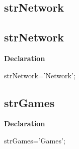 \documentclass{report}
\newif\ifpdf
\begin{document}
\subsection*{\large{\textbf{strNetwork}}\normalsize\hspace{1ex}\hrulefill}
\else
\subsection*{strNetwork}
\fi
\label{trstrings-strNetwork}
\begin{list}{}{
\setlength{\itemindent}{0cm}
\setlength{\listparindent}{0cm}
\setlength{\leftmargin}{\evensidemargin}
\addtolength{\leftmargin}{\tmplength}
\settowidth{\labelsep}{X}
\addtolength{\leftmargin}{\labelsep}
\setlength{\labelwidth}{\tmplength}
}
\item[\textbf{Declaration}\hfill]
\ifpdf
\begin{flushleft}
\fi
\begin{ttfamily}
strNetwork='Network';\end{ttfamily}

\ifpdf
\end{flushleft}
\fi

\end{list}
\ifpdf
\subsection*{\large{\textbf{strGames}}\normalsize\hspace{1ex}\hrulefill}
\else
\subsection*{strGames}
\fi
\label{trstrings-strGames}
\begin{list}{}{
\setlength{\itemindent}{0cm}
\setlength{\listparindent}{0cm}
\setlength{\leftmargin}{\evensidemargin}
\addtolength{\leftmargin}{\tmplength}
\settowidth{\labelsep}{X}
\addtolength{\leftmargin}{\labelsep}
\setlength{\labelwidth}{\tmplength}
}
\item[\textbf{Declaration}\hfill]
\ifpdf
\begin{flushleft}
\fi
\begin{ttfamily}
strGames='Games';\end{ttfamily}

\ifpdf
\end{flushleft}
\fi

\end{list}
\ifpdf
\end{document}
